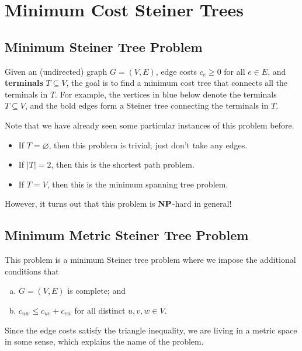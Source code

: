 \section{Minimum Cost Steiner Trees} \label{sec:5}

\subsection{Minimum Steiner Tree Problem}
Given an (undirected) graph $G = (V, E)$, edge costs $c_e \geq 0$ for all 
$e \in E$, and {\bf terminals} $T \subseteq V$, the goal is to find a 
minimum cost tree that connects all the terminals in $T$. For example, 
the vertices in blue below denote the terminals $T \subseteq V$, 
and the bold edges form a Steiner tree connecting the terminals in $T$. 
\begin{center}
\end{center}
\vspace{-0.25cm}
Note that we have already seen some particular instances of this problem before.
\begin{itemize}
    \item If $T = \varnothing$, then this problem is trivial; just don't take any edges.
    \item If $|T| = 2$, then this is the shortest path problem.
    \item If $T = V$, then this is the minimum spanning tree problem.
\end{itemize}
However, it turns out that this problem is $\mathbf{NP}$-hard in general!

\subsection{Minimum Metric Steiner Tree Problem} \label{subsec:5.2}
This problem is a minimum Steiner tree problem where we impose the additional 
conditions that
\begin{enumerate}[(a)]
    \item $G = (V, E)$ is complete; and 
    \item $c_{uw} \leq c_{uv} + c_{vw}$ for all distinct $u, v, w \in V$.
\end{enumerate}
Since the edge costs satisfy the triangle inequality, we are living 
in a metric space in some sense, which explains the name of the problem.

